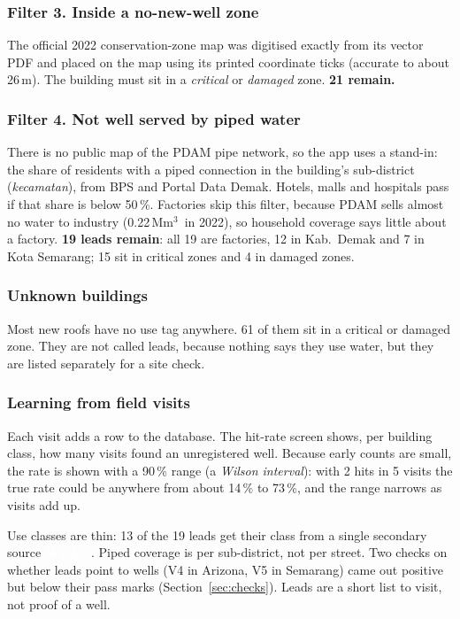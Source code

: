 \documentclass[11pt,a4paper]{article}
\newcommand{\pv}[2]{{\setlength{\fboxsep}{1.3pt}\colorbox{#1}{\textcolor{white}{\sffamily\bfseries\fontsize{6.3}{7}\selectfont #2}}}}
\newcommand{\Wk}{\pv{weak}{WEAK}}
\newcommand{\Mm}{\,Mm$^{3}$}
\begin{document}
\subsubsection{Filter 3. Inside a no-new-well zone}
The official 2022 conservation-zone map was digitised exactly from its vector PDF and placed on the map
using its printed coordinate ticks (accurate to about 26\,m). The building must sit in a \emph{critical}
or \emph{damaged} zone. \textbf{21 remain.}

\subsubsection{Filter 4. Not well served by piped water}
There is no public map of the PDAM pipe network, so the app uses a stand-in: the share of residents with a
piped connection in the building's sub-district (\emph{kecamatan}), from BPS and Portal Data Demak. Hotels,
malls and hospitals pass if that share is below 50\,\%. Factories skip this filter, because PDAM sells
almost no water to industry (0.22\Mm\ in 2022), so household coverage says little about a factory.
\textbf{19 leads remain}: all 19 are factories, 12 in Kab.\ Demak and 7 in Kota Semarang; 15 sit in
critical zones and 4 in damaged zones.

\subsubsection{Unknown buildings}
Most new roofs have no use tag anywhere. 61 of them sit in a critical or damaged zone. They are not called
leads, because nothing says they use water, but they are listed separately for a site check.

\subsubsection{Learning from field visits}
Each visit adds a row to the database. The hit-rate screen shows, per building class, how many visits
found an unregistered well. Because early counts are small, the rate is shown with a 90\,\% range (a
\emph{Wilson interval}): with 2 hits in 5 visits the true rate could be anywhere from about 14\,\% to
73\,\%, and the range narrows as visits add up.

\begin{caution}
Use classes are thin: 13 of the 19 leads get their class from a single secondary source \Wk. Piped
coverage is per sub-district, not per street. Two checks on whether leads point to wells (V4 in Arizona,
V5 in Semarang) came out positive but below their pass marks (Section~\ref{sec:checks}). Leads are a
short list to visit, not proof of a well.
\end{caution}
\end{document}
